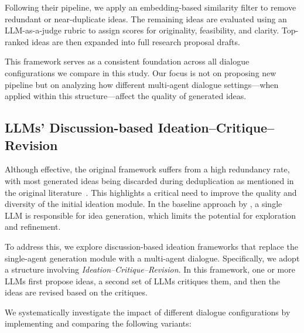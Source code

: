 \documentclass[11pt]{article}
\begin{document}
Following their pipeline, we apply an embedding-based similarity filter to remove redundant or near-duplicate ideas. The remaining ideas are evaluated using an LLM-as-a-judge rubric to assign scores for originality, feasibility, and clarity. Top-ranked ideas are then expanded into full research proposal drafts.

This framework serves as a consistent foundation across all dialogue configurations we compare in this study. Our focus is not on proposing new pipeline but on analyzing how different multi-agent dialogue settings—when applied within this structure—affect the quality of generated ideas.

\subsection{LLMs' Discussion-based Ideation–Critique–Revision}
\label{sec:model}

Although effective, the original framework suffers from a high redundancy rate, with most generated ideas being discarded during deduplication as mentioned in the original literature~\cite{su2025manyheads}. This highlights a critical need to improve the quality and diversity of the initial ideation module. In the baseline approach by \citet{si2025can}, a single LLM is responsible for idea generation, which limits the potential for exploration and refinement.

To address this, we explore discussion-based ideation frameworks that replace the single-agent generation module with a multi-agent dialogue. Specifically, we adopt a structure involving \textit{Ideation–Critique–Revision}. In this framework, one or more LLMs first propose ideas, a second set of LLMs critiques them, and then the ideas are revised based on the critiques.

We systematically investigate the impact of different dialogue configurations by implementing and comparing the following variants:
\end{document}
